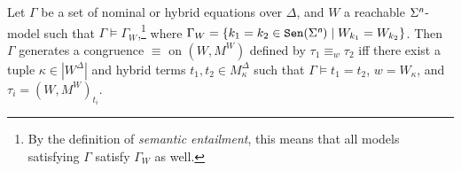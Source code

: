 \documentclass[a4paper,UKenglish,cleveref,autoref]{lipics-v2019}
\begin{document}
\begin{proposition}
  \label{proposition:Gamma-congruence}
  Let\/ $\Gamma$ be a set of nominal or hybrid equations over $\Delta$, and\/
  $W$ a reachable $\Sigma^{\text{\normalfont\sffamily\itshape n}}$-model such that\/
  $\Gamma \models \Gamma_{W}$,\footnote{By the definition of \emph{semantic entailment}, this means that all models satisfying $\Gamma$ satisfy $\Gamma_{W}$ as well.} where $\Gamma_{W} = \{k_{1} = k_{2} \in \mathtt{Sen}(\Sigma^{\text{\normalfont\sffamily\itshape n}}) \mid W_{k_{1}} = W_{k_{2}}\}$.
  Then $\Gamma$ generates a congruence $\equiv$ on $(W, M^W )$ defined by
  $\tau_{1} \equiv_w \tau_{2}$ iff 
  there exist a tuple $\kappa\in |W^\Delta|$ and hybrid terms $ t_{1}, t_{2}\in M^\Delta_\kappa $ such that 
  $\Gamma \models t_1 = t_2$, $w = W_\kappa$, and $\tau_i = (W,M^W )_{t_i}$.
\end{proposition}
\end{document}
